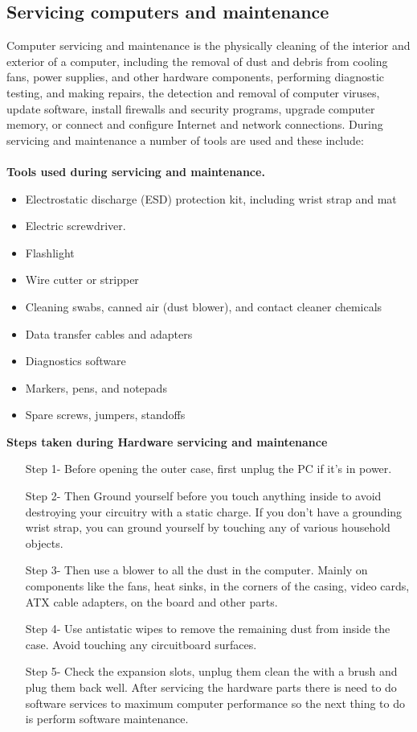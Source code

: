 \subsection{Servicing computers and maintenance}
Computer servicing and maintenance is the physically cleaning of the interior a​nd  ​exterior of a computer, including the removal of dust and debris from cooling fans, power supplies, and other hardware components, performing diagnostic testing, and making repairs, the detection and removal of computer viruses, update software, install firewalls and security programs, upgrade computer memory, or connect and configure Internet and network connections. During servicing and maintenance a number of tools are used and these include: \\ \\
\textbf{Tools used during servicing and maintenance.} \\ 
\begin{itemize}
\item Electrostatic discharge (ESD) protection kit, including wrist strap and mat 
\item Electric screwdriver.
\item Flashlight
\item Wire cutter or stripper
\item Cleaning swabs, canned air (dust blower), and contact cleaner chemicals
\item Data transfer cables and adapters
\item Diagnostics software
\item Markers, pens, and notepads
\item Spare screws, jumpers, standoffs

\end{itemize}
\textbf{Steps taken during Hardware servicing and maintenance} \\
\begin{itemize}
\item[Step 1-]Before opening the outer case, first unplug the PC if it’s in power.
\item[Step 2-]Then Ground yourself before you touch anything inside to avoid destroying your circuitry with a static charge. If you don't have a grounding wrist strap, you can ground yourself by touching any of various household objects. 
\item[Step 3-]Then use a blower to all the dust in the computer. Mainly on components like the fans, heat sinks, in the corners of the casing, video cards, ATX cable adapters, on the board and other parts. 
\item[Step 4-]Use antistatic wipes to remove the remaining dust from inside the case. Avoid touching any circuit­board surfaces.
\item[Step 5-]Check the expansion slots, unplug them clean the with a brush and plug them back well. After servicing the hardware parts there is need to do software services to maximum computer performance so the next thing to do is perform software maintenance. 
\end{itemize}
